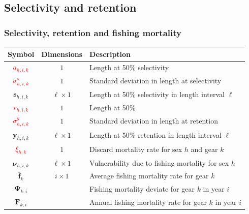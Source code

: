 \documentclass{beamer}
\begin{document}
\subsection{Selectivity and retention}
\begin{frame}
\frametitle{Selectivity, retention and fishing mortality}
\begin{table}
  \centering
  \begin{tabular}{ccl}
  \hline
  Symbol & Dimensions & Description \\
  \hline
      \textcolor{red}{$a_{h,i,k}$} & $1$ & Length at 50\% selectivity \\
      \textcolor{red}{$\sigma^s_{h,i,k}$} & $1$ & Standard deviation in length at selectivity \\
      $\boldsymbol{s}_{h,i,k}$ & $\ell \times 1$ & Length at 50\% selectivity in length interval $\ell$ \\
      \textcolor{red}{$r_{h,i,k}$} & $1$ & Length at 50\% \\
      \textcolor{red}{$\sigma^y_{h,i,k}$} & $1$ & Standard deviation in length at retention \\
      $\boldsymbol{y}_{h,i,k}$ & $\ell \times 1$ & Length at 50\% retention in length interval $\ell$ \\
      \textcolor{red}{$\xi_{h,k}$} & $1$ & Discard mortality rate for sex $h$ and gear $k$ \\
      $\boldsymbol\nu_{h,i,k}$ & $\ell \times 1$ & Vulnerability due to fishing mortality for sex $h$ \\
      $\bar{\boldsymbol{f}}_k$ & $i \times 1$ & Average fishing mortality rate for gear $k$ \\
      $\boldsymbol\Psi_{k,i}$ & & Fishing mortality deviate for gear $k$ in year $i$ \\
      $\boldsymbol{F}_{k,i}$ & & Annual fishing mortality rate for gear $k$ in year $i$ \\
  \hline
  \end{tabular}
\end{table}
\end{frame}

\end{document}

